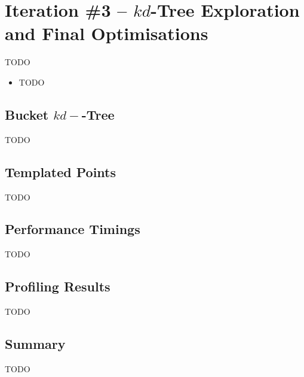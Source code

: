 \section{Iteration \#3 -- $kd$-Tree Exploration and Final Optimisations}

TODO
\begin{itemize}
	\item TODO
\end{itemize}

\subsection{Bucket $kd-$-Tree}

TODO

\subsection{Templated Points}

TODO

\subsection{Performance Timings}

TODO

\subsection{Profiling Results}

TODO

\subsection{Summary}

TODO